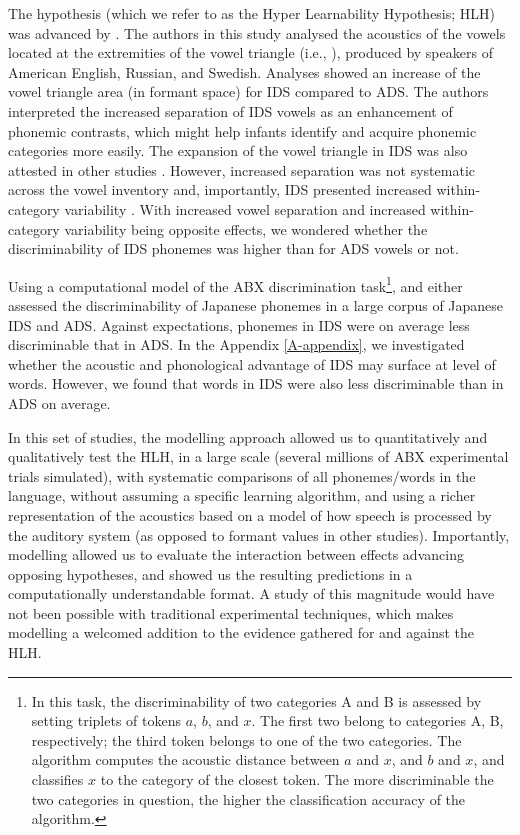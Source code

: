 The hypothesis (which we refer to as the Hyper Learnability Hypothesis; HLH) was advanced by \cite{kuhl1997}. The authors in this study analysed the acoustics of the vowels located at the extremities of the vowel triangle (i.e., ), produced by speakers of American English, Russian, and Swedish. Analyses showed an increase of the vowel triangle area (in formant space) for IDS compared to ADS. The authors interpreted the increased separation of IDS vowels as an enhancement of phonemic contrasts, which might help infants identify and acquire phonemic categories more easily. The expansion of the vowel triangle in IDS was also attested in other studies \cite{andruski1999, bernstein1984, burnham2002, cristia2014, liu2003, mcmurray2013, uther2007}. However, increased separation was not systematic across the vowel inventory \cite{cristia2014} and, importantly, IDS presented increased within-category variability \cite{mcmurray2013, cristia2014, kirchoff2005}. With increased vowel separation and increased within-category variability being opposite effects, we wondered whether the discriminability of IDS phonemes was higher than for ADS vowels or not.

Using a computational model of the ABX discrimination task\footnote{In this task, the discriminability of two categories \textsc{A} and \textsc{B} is assessed by setting triplets of tokens $a$, $b$, and $x$. The first two belong to categories \textsc{A}, \textsc{B}, respectively; the third token belongs to one of the two categories. The algorithm computes the acoustic distance between $a$ and $x$, and $b$ and $x$, and classifies $x$ to the category of the closest token. The more discriminable the two categories in question, the higher the classification accuracy of the algorithm.}, and either \cite{martin2015} assessed the discriminability of Japanese phonemes in a large corpus of Japanese IDS and ADS. Against expectations, phonemes in IDS were on average less discriminable that in ADS. In the Appendix \ref{A-appendix}, we investigated whether the acoustic and phonological advantage of IDS may surface at level of words. However, we found that words in IDS were also less discriminable than in ADS on average. 

In this set of studies, the modelling approach allowed us to quantitatively and qualitatively test the HLH, in a large scale (several millions of ABX experimental trials simulated), with systematic comparisons of all phonemes/words in the language, without assuming a specific learning algorithm, and using a richer representation of the acoustics based on a model of how speech is processed by the auditory system (as opposed to formant values in other studies). Importantly, modelling allowed us to evaluate the interaction between effects advancing opposing hypotheses, and showed us the resulting predictions in a computationally understandable format. A study of this magnitude would have not been possible with traditional experimental techniques, which makes modelling a welcomed addition to the evidence gathered for and against the HLH.  


